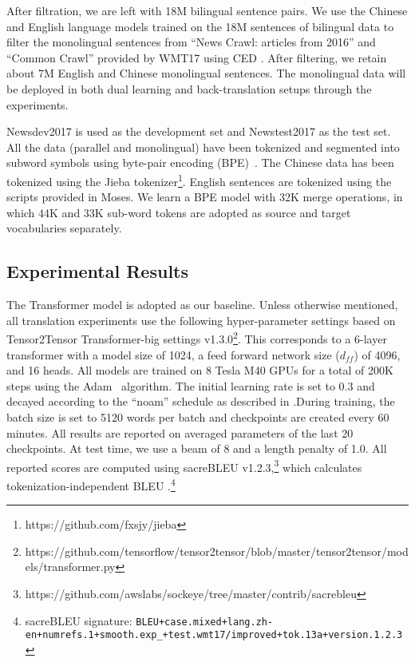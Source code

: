 \documentclass[a4paper]{article}
\begin{document}
\begin{CJK*}{UTF8}{gbsn}
After filtration, we are left with 18M bilingual sentence pairs. We use the Chinese and English language models trained on the 18M sentences of bilingual data to filter the monolingual sentences from ``News Crawl: articles from 2016'' and ``Common Crawl'' provided by WMT17 using CED \cite{Moorelewis}. After filtering, we retain about 7M English and Chinese monolingual sentences. The monolingual data will be deployed in both dual learning and back-translation setups through the experiments.


Newsdev2017 is used as the development set and Newstest2017 as the test set. 
All the data (parallel and monolingual) have been tokenized and segmented into subword symbols using byte-pair encoding (BPE)~\cite{sennrich2015neural}.
The Chinese data has been tokenized using the Jieba tokenizer\footnote{https://github.com/fxsjy/jieba}. English sentences are tokenized using the scripts provided in Moses. We learn a BPE model  with 32K merge operations, in which 44K and 33K sub-word tokens are adopted as source and target vocabularies separately. 
 





\subsection{Experimental Results}

The Transformer model \cite{Vaswani2017AttentionIA} is adopted as our baseline.
Unless otherwise mentioned, all translation experiments use the following hyper-parameter settings based on Tensor2Tensor Transformer-big settings v1.3.0\footnote{https://github.com/tensorflow/tensor2tensor/blob/master/tensor2tensor/models/transformer.py}. This corresponds to a 6-layer transformer with a model size of 1024, a feed forward network size ($d_{ff}$) of 4096, and 16 heads. All models are trained on 8 Tesla M40 GPUs for a total of 200K steps using the Adam~\cite{Kingma2014AdamAM} algorithm. The initial learning rate is set to 0.3 and decayed according to the ``noam'' schedule as described in \cite{Vaswani2017AttentionIA}.During training, the batch size is set to 5120 words per batch and checkpoints are created every 60 minutes. All  results are reported on averaged parameters of the last 20 checkpoints. At test time, we use a beam of 8 and a length penalty of 1.0. All reported scores are computed using sacreBLEU v1.2.3,\footnote{https://github.com/awslabs/sockeye/tree/master/contrib/sacrebleu} which calculates tokenization-independent BLEU \cite{papineni2002bleu}.\footnote{sacreBLEU signature: \texttt{BLEU+case.mixed+lang.zh-en+numrefs.1+smooth.exp\_+test.wmt17/improved+tok.13a+version.1.2.3}}


\end{CJK*}
\end{document}
